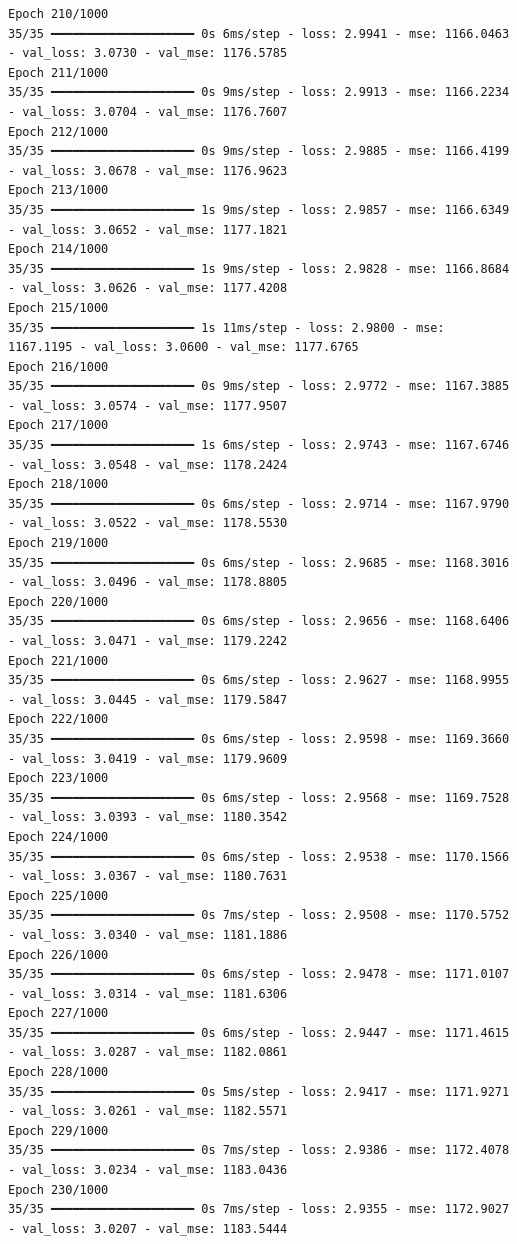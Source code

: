 \documentclass[
  letterpaper,
  DIV=11,
  numbers=noendperiod]{scrreprt}
\begin{document}
\begin{verbatim}
Epoch 210/1000
35/35 ━━━━━━━━━━━━━━━━━━━━ 0s 6ms/step - loss: 2.9941 - mse: 1166.0463 - val_loss: 3.0730 - val_mse: 1176.5785
Epoch 211/1000
35/35 ━━━━━━━━━━━━━━━━━━━━ 0s 9ms/step - loss: 2.9913 - mse: 1166.2234 - val_loss: 3.0704 - val_mse: 1176.7607
Epoch 212/1000
35/35 ━━━━━━━━━━━━━━━━━━━━ 0s 9ms/step - loss: 2.9885 - mse: 1166.4199 - val_loss: 3.0678 - val_mse: 1176.9623
Epoch 213/1000
35/35 ━━━━━━━━━━━━━━━━━━━━ 1s 9ms/step - loss: 2.9857 - mse: 1166.6349 - val_loss: 3.0652 - val_mse: 1177.1821
Epoch 214/1000
35/35 ━━━━━━━━━━━━━━━━━━━━ 1s 9ms/step - loss: 2.9828 - mse: 1166.8684 - val_loss: 3.0626 - val_mse: 1177.4208
Epoch 215/1000
35/35 ━━━━━━━━━━━━━━━━━━━━ 1s 11ms/step - loss: 2.9800 - mse: 1167.1195 - val_loss: 3.0600 - val_mse: 1177.6765
Epoch 216/1000
35/35 ━━━━━━━━━━━━━━━━━━━━ 0s 9ms/step - loss: 2.9772 - mse: 1167.3885 - val_loss: 3.0574 - val_mse: 1177.9507
Epoch 217/1000
35/35 ━━━━━━━━━━━━━━━━━━━━ 1s 6ms/step - loss: 2.9743 - mse: 1167.6746 - val_loss: 3.0548 - val_mse: 1178.2424
Epoch 218/1000
35/35 ━━━━━━━━━━━━━━━━━━━━ 0s 6ms/step - loss: 2.9714 - mse: 1167.9790 - val_loss: 3.0522 - val_mse: 1178.5530
Epoch 219/1000
35/35 ━━━━━━━━━━━━━━━━━━━━ 0s 6ms/step - loss: 2.9685 - mse: 1168.3016 - val_loss: 3.0496 - val_mse: 1178.8805
Epoch 220/1000
35/35 ━━━━━━━━━━━━━━━━━━━━ 0s 6ms/step - loss: 2.9656 - mse: 1168.6406 - val_loss: 3.0471 - val_mse: 1179.2242
Epoch 221/1000
35/35 ━━━━━━━━━━━━━━━━━━━━ 0s 6ms/step - loss: 2.9627 - mse: 1168.9955 - val_loss: 3.0445 - val_mse: 1179.5847
Epoch 222/1000
35/35 ━━━━━━━━━━━━━━━━━━━━ 0s 6ms/step - loss: 2.9598 - mse: 1169.3660 - val_loss: 3.0419 - val_mse: 1179.9609
Epoch 223/1000
35/35 ━━━━━━━━━━━━━━━━━━━━ 0s 6ms/step - loss: 2.9568 - mse: 1169.7528 - val_loss: 3.0393 - val_mse: 1180.3542
Epoch 224/1000
35/35 ━━━━━━━━━━━━━━━━━━━━ 0s 6ms/step - loss: 2.9538 - mse: 1170.1566 - val_loss: 3.0367 - val_mse: 1180.7631
Epoch 225/1000
35/35 ━━━━━━━━━━━━━━━━━━━━ 0s 7ms/step - loss: 2.9508 - mse: 1170.5752 - val_loss: 3.0340 - val_mse: 1181.1886
Epoch 226/1000
35/35 ━━━━━━━━━━━━━━━━━━━━ 0s 6ms/step - loss: 2.9478 - mse: 1171.0107 - val_loss: 3.0314 - val_mse: 1181.6306
Epoch 227/1000
35/35 ━━━━━━━━━━━━━━━━━━━━ 0s 6ms/step - loss: 2.9447 - mse: 1171.4615 - val_loss: 3.0287 - val_mse: 1182.0861
Epoch 228/1000
35/35 ━━━━━━━━━━━━━━━━━━━━ 0s 5ms/step - loss: 2.9417 - mse: 1171.9271 - val_loss: 3.0261 - val_mse: 1182.5571
Epoch 229/1000
35/35 ━━━━━━━━━━━━━━━━━━━━ 0s 7ms/step - loss: 2.9386 - mse: 1172.4078 - val_loss: 3.0234 - val_mse: 1183.0436
Epoch 230/1000
35/35 ━━━━━━━━━━━━━━━━━━━━ 0s 7ms/step - loss: 2.9355 - mse: 1172.9027 - val_loss: 3.0207 - val_mse: 1183.5444

\end{verbatim}
\end{document}
